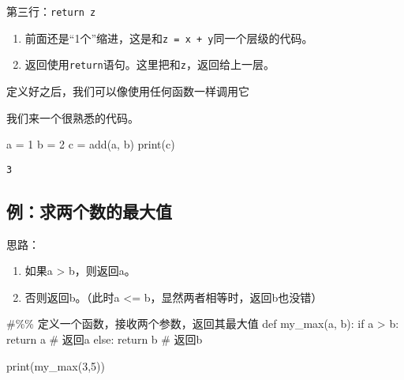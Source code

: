 \documentclass[
  letterpaper,
  DIV=11,
  numbers=noendperiod]{scrreprt}
\newenvironment{Shaded}{\begin{snugshade}}{\end{snugshade}}
\newcommand{\BuiltInTok}[1]{\textcolor[rgb]{0.00,0.23,0.31}{#1}}
\newcommand{\CommentTok}[1]{\textcolor[rgb]{0.37,0.37,0.37}{#1}}
\newcommand{\ControlFlowTok}[1]{\textcolor[rgb]{0.00,0.23,0.31}{#1}}
\newcommand{\DecValTok}[1]{\textcolor[rgb]{0.68,0.00,0.00}{#1}}
\newcommand{\KeywordTok}[1]{\textcolor[rgb]{0.00,0.23,0.31}{#1}}
\newcommand{\NormalTok}[1]{\textcolor[rgb]{0.00,0.23,0.31}{#1}}
\newcommand{\OperatorTok}[1]{\textcolor[rgb]{0.37,0.37,0.37}{#1}}
\providecommand{\tightlist}{%
  \setlength{\itemsep}{0pt}\setlength{\parskip}{0pt}}\usepackage{longtable,booktabs,array}
\begin{document}
第三行：\texttt{return\ z}

\begin{enumerate}
\def\labelenumi{\arabic{enumi}.}
\tightlist
\item
  前面还是``1个''缩进，这是和\texttt{z\ =\ x\ +\ y}同一个层级的代码。
\item
  返回使用\texttt{return}语句。这里把和\texttt{z}，返回给上一层。
\end{enumerate}

定义好之后，我们可以像使用任何函数一样调用它

我们来一个很熟悉的代码。

\begin{Shaded}
\begin{Highlighting}[]
\NormalTok{a }\OperatorTok{=} \DecValTok{1}
\NormalTok{b }\OperatorTok{=} \DecValTok{2}
\NormalTok{c }\OperatorTok{=}\NormalTok{ add(a, b) }
\BuiltInTok{print}\NormalTok{(c)}
\end{Highlighting}
\end{Shaded}

\begin{verbatim}
3
\end{verbatim}

\hypertarget{ux4f8bux6c42ux4e24ux4e2aux6570ux7684ux6700ux5927ux503c}{%
\subsection{例：求两个数的最大值}\label{ux4f8bux6c42ux4e24ux4e2aux6570ux7684ux6700ux5927ux503c}}

思路：

\begin{enumerate}
\def\labelenumi{\arabic{enumi}.}
\tightlist
\item
  如果a \textgreater{} b，则返回a。
\item
  否则返回b。（此时a \textless= b，显然两者相等时，返回b也没错）
\end{enumerate}

\begin{Shaded}
\begin{Highlighting}[]
\CommentTok{\#\%\% 定义一个函数，接收两个参数，返回其最大值}
\KeywordTok{def}\NormalTok{ my\_max(a, b):}
    \ControlFlowTok{if}\NormalTok{ a }\OperatorTok{\textgreater{}}\NormalTok{ b:}
        \ControlFlowTok{return}\NormalTok{ a  }\CommentTok{\# 返回a}
    \ControlFlowTok{else}\NormalTok{:}
        \ControlFlowTok{return}\NormalTok{ b  }\CommentTok{\# 返回b  }
        
\BuiltInTok{print}\NormalTok{(my\_max(}\DecValTok{3}\NormalTok{,}\DecValTok{5}\NormalTok{))}
\end{Highlighting}
\end{Shaded}
\end{document}
